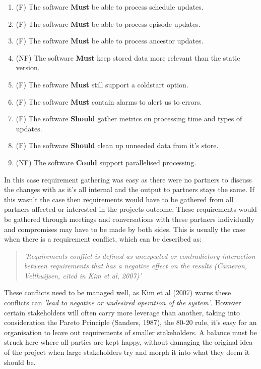   \begin{enumerate}
    \item (F) The software \textbf{Must} be able to process schedule updates. 
    \item (F) The software \textbf{Must} be able to process episode updates.
    \item (F) The software \textbf{Must} be able to process ancestor updates.
    \item (NF) The software \textbf{Must} keep stored data more relevant than the static version.
    \item (F) The software \textbf{Must} still support a coldstart option.
    \item (F) The software \textbf{Must} contain alarms to alert us to errors.
    \item (F) The software \textbf{Should} gather metrics on processing time and types of updates.
    \item (F) The software \textbf{Should} clean up unneeded data from it's store.
    \item (NF) The software \textbf{Could} support parallelised processing.
  \end{enumerate}

  In this case requirement gathering was easy as there were no partners to discuss the changes with as it's all internal and the output to partners
  stays the same. If this wasn't the case then requirements would have to be gathered from all partners affected or interested in the projects 
  outcome. These requirements would be gathered through meetings and conversations with these partners individually and compromises may have to 
  be made by both sides.
  This is usually the case when there is a requirement conflict, which can be described as:
  \begin{quote}
    \textit{'Requirements conflict is defined as unexpected or contradictory interaction between requirements that has a negative 
    effect on the results (Cameron, Velthuijsen, cited in Kim et al, 2007)'}
  \end{quote}
  These conflicts need to be managed well, as Kim et al (2007) warns these conflicts can \textit{'lead 
  to negative or undesired operation of the system'}. However certain stakeholders will often carry more leverage than another, taking into 
  consideration the Pareto Principle (Sanders, 1987), the 80-20 rule, it's easy for an organisation to leave out requirements of smaller stakeholders.
  A balance must be struck here where all parties are kept happy, without damaging the original idea of the project when large stakeholders try 
  and morph it into what they deem it should be.

